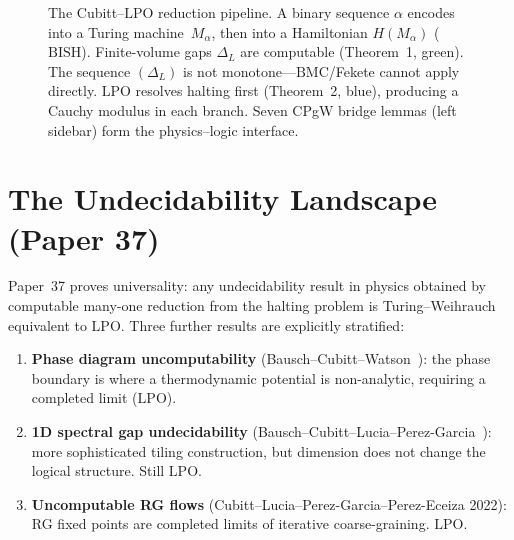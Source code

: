 \documentclass[11pt,a4paper]{report}
\theoremstyle{plain}
\theoremstyle{definition}
\theoremstyle{remark}
\newcommand{\BISH}{\mathrm{BISH}}
\newcommand{\LPO}{\mathrm{LPO}}
\newcommand{\BMC}{\mathrm{BMC}}
\begin{document}
\begin{figure}[ht]
\caption{The Cubitt--$\LPO$ reduction pipeline. A binary sequence $\alpha$ encodes into a Turing machine~$M_\alpha$, then into a Hamiltonian $H(M_\alpha)$ ($\BISH$). Finite-volume gaps $\Delta_L$ are computable (Theorem~1, green). The sequence $(\Delta_L)$ is not monotone---$\BMC$/Fekete cannot apply directly. $\LPO$ resolves halting first (Theorem~2, blue), producing a Cauchy modulus in each branch. Seven CPgW bridge lemmas (left sidebar) form the physics--logic interface.}
\label{fig:cubitt-pipeline}
\end{figure}

\section{The Undecidability Landscape (Paper 37)}

Paper~37 proves universality: any undecidability result in physics obtained by computable many-one reduction from the halting problem is Turing--Weihrauch equivalent to $\LPO$. Three further results are explicitly stratified:
\begin{enumerate}[nosep]
\item \textbf{Phase diagram uncomputability} (Bausch--Cubitt--Watson~\cite{BauschCubittWatson2021}): the phase boundary is where a thermodynamic potential is non-analytic, requiring a completed limit ($\LPO$).
\item \textbf{1D spectral gap undecidability} (Bausch--Cubitt--Lucia--Perez-Garcia~\cite{BauschCubittLucia2020}): more sophisticated tiling construction, but dimension does not change the logical structure. Still $\LPO$.
\item \textbf{Uncomputable RG flows} (Cubitt--Lucia--Perez-Garcia--Perez-Eceiza 2022): RG fixed points are completed limits of iterative coarse-graining. $\LPO$.
\end{enumerate}
\end{document}
